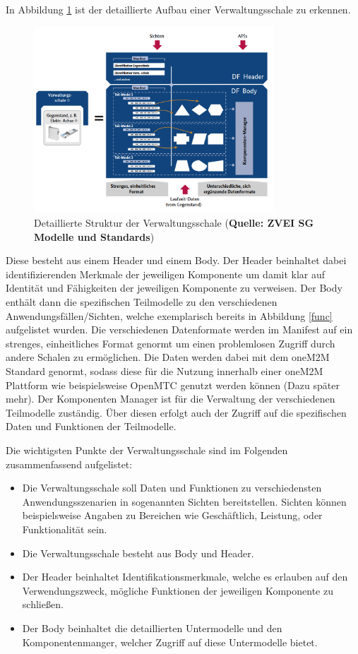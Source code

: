 \documentclass[
	12pt,								%
	DIV10,
	a4paper,         		%
	oneside,						%
	parskip=half,				%
	headings=normal,			%
	listof=totoc,					%
	bibliography=totoc,						%
	index=totoc,						%
	final								%
]{scrartcl}
\begin{document}
In Abbildung \ref{struc} ist der detaillierte Aufbau einer Verwaltungsschale zu erkennen.
\begin{figure}[H]
\centering
\includegraphics[width=0.8\textwidth]{sturktur}
\caption{Detaillierte Struktur der Verwaltungsschale (\textbf{Quelle: ZVEI SG Modelle und Standards})}
\label{struc}
\end{figure}

Diese besteht aus einem Header und einem Body. Der Header beinhaltet dabei identifizierenden Merkmale der jeweiligen Komponente um damit klar auf Identität und Fähigkeiten der jeweiligen Komponente zu verweisen. 
Der Body enthält dann die spezifischen Teilmodelle zu den verschiedenen Anwendungsfällen/Sichten, welche exemplarisch bereits in Abbildung \ref{func} aufgelistet wurden. Die verschiedenen Datenformate werden im Manifest auf ein strenges, einheitliches Format genormt um einen problemlosen Zugriff durch andere Schalen zu ermöglichen. Die Daten werden dabei mit dem oneM2M Standard genormt, sodass diese für die Nutzung innerhalb einer oneM2M Plattform wie beispielsweise OpenMTC genutzt werden können (Dazu später mehr). Der Komponenten Manager ist für die Verwaltung der verschiedenen Teilmodelle zuständig. Über diesen erfolgt auch der Zugriff auf die spezifischen Daten und Funktionen der Teilmodelle. 


Die wichtigsten Punkte der Verwaltungsschale sind im Folgenden zusammenfassend aufgelistet:
\begin{itemize}
\item Die Verwaltungsschale soll Daten und Funktionen zu verschiedensten Anwendungsszenarien in sogenannten Sichten bereitstellen. Sichten können beispielsweise Angaben zu Bereichen wie Geschäftlich, Leistung, oder Funktionalität sein.
\item Die Verwaltungsschale besteht aus Body und Header.
\item Der Header beinhaltet Identifikationsmerkmale, welche es erlauben auf den Verwendungszweck, mögliche Funktionen  der jeweiligen Komponente zu schließen. 
\item Der Body beinhaltet die detaillierten Untermodelle und den Komponentenmanger, welcher Zugriff auf diese Untermodelle bietet.
\end{itemize}
\end{document}
